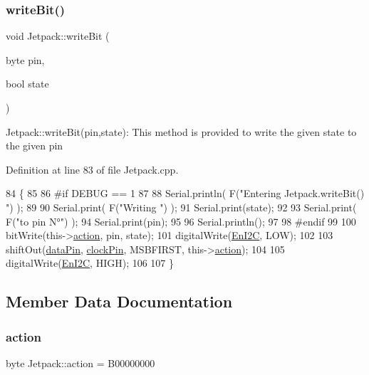 \subsubsection{\texorpdfstring{write\+Bit()}{writeBit()}}
{\footnotesize\ttfamily void Jetpack\+::write\+Bit (\begin{DoxyParamCaption}\item[{byte}]{pin,  }\item[{bool}]{state }\end{DoxyParamCaption})}

Jetpack\+::write\+Bit(pin,state)\+: This method is provided to write the given state to the given pin 

Definition at line 83 of file Jetpack.\+cpp.


\begin{DoxyCode}
84 \{
85 
86 \textcolor{preprocessor}{#if DEBUG == 1 }
87 
88     Serial.println( F(\textcolor{stringliteral}{"Entering Jetpack.writeBit() "}) );
89 
90     Serial.print( F(\textcolor{stringliteral}{"Writing "}) );
91     Serial.print(state);
92 
93     Serial.print( F(\textcolor{stringliteral}{"to pin N°"}) );
94     Serial.print(pin);
95 
96     Serial.println();
97 
98 \textcolor{preprocessor}{#endif}
99 
100     bitWrite(this->\hyperlink{class_jetpack_aca3142925a7b0834b34ae91d26af7765}{action}, pin, state);
101     digitalWrite(\hyperlink{class_jetpack_a81df984fb4cea98c71aa1a1cfcdfe814}{EnI2C}, LOW);
102     
103     shiftOut(\hyperlink{class_jetpack_a3d669a56e93c71dd25f970d4ed7d0c00}{dataPin}, \hyperlink{class_jetpack_a58ebb991f358f3ae94e82148b0221b5a}{clockPin}, MSBFIRST, this->\hyperlink{class_jetpack_aca3142925a7b0834b34ae91d26af7765}{action});
104 
105     digitalWrite(\hyperlink{class_jetpack_a81df984fb4cea98c71aa1a1cfcdfe814}{EnI2C}, HIGH);
106 
107 \}
\end{DoxyCode}


\subsection{Member Data Documentation}
\mbox{\label{class_jetpack_aca3142925a7b0834b34ae91d26af7765}} 
\subsubsection{\texorpdfstring{action}{action}}
{\footnotesize\ttfamily byte Jetpack\+::action = B00000000\hspace{0.3cm}{\ttfamily [private]}}



